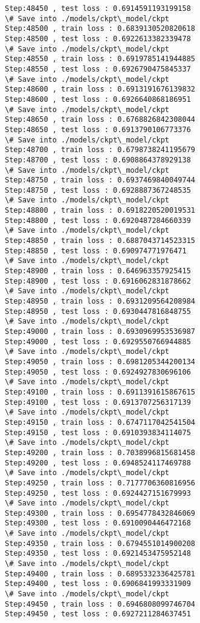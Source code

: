 \documentclass[11pt]{article}
\begin{document}
\begin{Verbatim}[commandchars=\\\{\}]
Step:48450 , test loss : 0.6914591193199158
\# Save into ./models/ckpt\_model/ckpt
Step:48500 , train loss : 0.6839130520820618
Step:48500 , test loss : 0.6922613382339478
\# Save into ./models/ckpt\_model/ckpt
Step:48550 , train loss : 0.6919785141944885
Step:48550 , test loss : 0.6926790475845337
\# Save into ./models/ckpt\_model/ckpt
Step:48600 , train loss : 0.6913191676139832
Step:48600 , test loss : 0.6926640868186951
\# Save into ./models/ckpt\_model/ckpt
Step:48650 , train loss : 0.6768826842308044
Step:48650 , test loss : 0.6913790106773376
\# Save into ./models/ckpt\_model/ckpt
Step:48700 , train loss : 0.6798738241195679
Step:48700 , test loss : 0.6908864378929138
\# Save into ./models/ckpt\_model/ckpt
Step:48750 , train loss : 0.6937469840049744
Step:48750 , test loss : 0.6928887367248535
\# Save into ./models/ckpt\_model/ckpt
Step:48800 , train loss : 0.6918220520019531
Step:48800 , test loss : 0.6920487284660339
\# Save into ./models/ckpt\_model/ckpt
Step:48850 , train loss : 0.6887043714523315
Step:48850 , test loss : 0.690974771976471
\# Save into ./models/ckpt\_model/ckpt
Step:48900 , train loss : 0.646963357925415
Step:48900 , test loss : 0.6916062831878662
\# Save into ./models/ckpt\_model/ckpt
Step:48950 , train loss : 0.6931209564208984
Step:48950 , test loss : 0.6930447816848755
\# Save into ./models/ckpt\_model/ckpt
Step:49000 , train loss : 0.6930969953536987
Step:49000 , test loss : 0.6929550766944885
\# Save into ./models/ckpt\_model/ckpt
Step:49050 , train loss : 0.6981205344200134
Step:49050 , test loss : 0.6924927830696106
\# Save into ./models/ckpt\_model/ckpt
Step:49100 , train loss : 0.6911391615867615
Step:49100 , test loss : 0.6913707256317139
\# Save into ./models/ckpt\_model/ckpt
Step:49150 , train loss : 0.6747117042541504
Step:49150 , test loss : 0.6910393834114075
\# Save into ./models/ckpt\_model/ckpt
Step:49200 , train loss : 0.7038996815681458
Step:49200 , test loss : 0.6948524117469788
\# Save into ./models/ckpt\_model/ckpt
Step:49250 , train loss : 0.7177706360816956
Step:49250 , test loss : 0.6924427151679993
\# Save into ./models/ckpt\_model/ckpt
Step:49300 , train loss : 0.6954778432846069
Step:49300 , test loss : 0.6910090446472168
\# Save into ./models/ckpt\_model/ckpt
Step:49350 , train loss : 0.6794551014900208
Step:49350 , test loss : 0.6921453475952148
\# Save into ./models/ckpt\_model/ckpt
Step:49400 , train loss : 0.6895332336425781
Step:49400 , test loss : 0.6906841993331909
\# Save into ./models/ckpt\_model/ckpt
Step:49450 , train loss : 0.6946808099746704
Step:49450 , test loss : 0.6927211284637451

\end{Verbatim}
\end{document}

